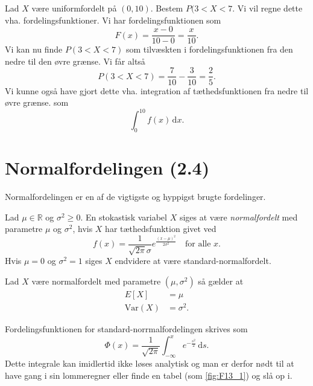 \begin{eks} [Uniformfordeling]
  Lad $X$ være uniformfordelt på $(0, 10)$. Bestem $P(3 < X < 7$.
  \bigbreak
  Vi vil regne dette vha. fordelingsfunktioner. Vi har fordelingsfunktionen som
  \[ 
  F(x) = \frac{x-0}{10 - 0} = \frac{x}{10}
  .\]
  Vi kan nu finde $P(3 < X < 7)$ som tilvæskten i fordelingsfunktionen fra den nedre til den øvre grænse. Vi får altså
  \[ 
  P(3 < X < 7) = \frac{7}{10} - \frac{3}{10} = \frac{2}{5}
  .\]
  Vi kunne også have gjort dette vha. integration af tæthedsfunktionen fra nedre til øvre grænse. som
  \[ 
  \int_{0}^{10} f(x) \, \mathrm{d}x 
  .\]
\end{eks}

\section{Normalfordelingen (2.4)} \label{afs:fornor}
Normalfordelingen er en af de vigtigste og hyppigst brugte fordelinger.

\begin{definition} [Normalfordeling]
  Lad $\mu \in \mathbb{R}$ og $\sigma^2 \geq 0$. En stokastisk variabel $X$ siges at være \textit{normalfordelt} med parametre $\mu$ og $\sigma^2$, hvis $X$ har tæthedsfunktion givet ved
  \[ 
  f(x) = \frac{1}{\sqrt{2\pi}\sigma}e^{\frac{(x-\mu)^2}{2\sigma^2}} \quad \text{for alle } x
  .\]
  Hvis $\mu = 0$ og $\sigma^2 = 1$ siges $X$ endvidere at være standard-normalfordelt.
\end{definition}

\begin{sæt} 
  Lad $X$ være normalfordelt med parametre $\left(\mu, \sigma^2\right)$ så gælder at
  \begin{align*}
    E[X] &= \mu \\
    \mathrm{Var}(X) &= \sigma^2
  .\end{align*}
\end{sæt}

\begin{sæt} 
  Fordelingsfunktionen for standard-norrmalfordelingen skrives som
  \[ 
  \Phi(x) = \frac{1}{\sqrt{2\pi}} \int_{-\infty}^{x} e^{-\frac{s^2}{2}} \, \mathrm{d}s
  .\]
  Dette integrale kan imidlertid ikke løses analytisk og man er derfor nødt til at have gang i sin lommeregner eller finde en tabel (som \autoref{fig:F13_1}) og slå op i.
\end{sæt}


